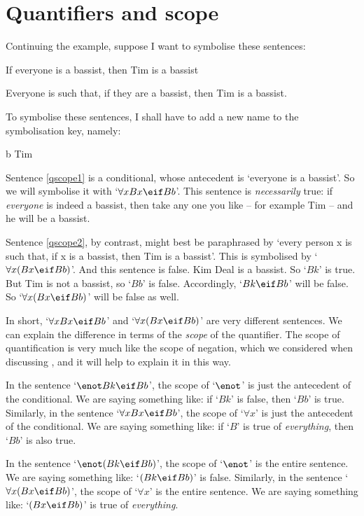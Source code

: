 \section{Quantifiers and scope}
Continuing the example, suppose I want to symbolise these sentences:
	\begin{earg}
		\item[\ex{qscope1}] If everyone is a bassist, then Tim is a bassist
		\item[\ex{qscope2}] Everyone is such that, if they are a bassist, then Tim is a bassist.
	\end{earg}
To symbolise these sentences, I shall have to add a new name to the symbolisation key, namely:
	\begin{ekey}
		\item[b] Tim
	\end{ekey}
Sentence \ref{qscope1} is a conditional, whose antecedent is `everyone is a bassist'. So we will symbolise it with `$\forall x Bx \eif Bb$'. This sentence is \emph{necessarily} true: if \emph{everyone} is indeed a bassist, then take any one you like – for example Tim – and he will be a bassist. 

Sentence \ref{qscope2}, by contrast, might best be paraphrased by `every person x is such that, if x is a bassist, then Tim is a bassist'. This is symbolised by `$\forall x (Bx \eif Bb)$'. And this sentence is false. Kim Deal is a bassist. So `$Bk$' is true. But Tim is not a bassist, so `$Bb$' is false. Accordingly, `$Bk \eif Bb$' will be false. So `$\forall x (Bx \eif Bb)$' will be false as well. 

In short, `$\forall x Bx \eif Bb$' and `$\forall x (Bx \eif Bb)$' are very different sentences. We can explain the difference in terms of the \emph{scope} of the quantifier. The scope of quantification is very much like the scope of negation, which we considered when discussing \TFL, and it will help to explain it in this way.

In the sentence `$\enot Bk \eif Bb$', the scope of `$\enot$' is just the antecedent of the conditional. We are saying something like: if `$Bk$' is false, then `$Bb$' is true. Similarly, in the sentence `$\forall x Bx \eif Bb$', the scope of `$\forall x$' is just the antecedent of the conditional. We are saying something like: if `$B$' is true of \emph{everything}, then `$Bb$' is also true. 

In the sentence `$\enot(Bk \eif Bb)$', the scope of `$\enot$' is the entire sentence. We are saying something like: `$(Bk \eif Bb)$' is false. Similarly, in the sentence `$\forall x (Bx \eif Bb)$', the scope of `$\forall x$' is the entire sentence. We are saying something like: `$(Bx \eif Bb)$' is true of \emph{everything}.

